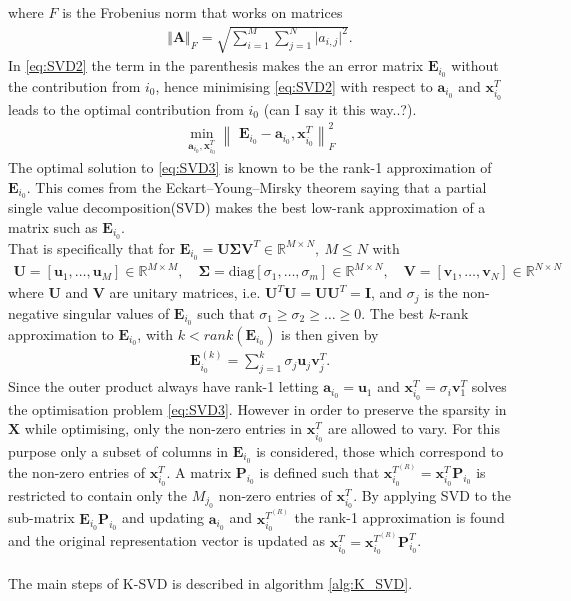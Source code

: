 where $F$ is the Frobenius norm that works on matrices
\begin{align*}
\Vert \mathbf{A} \Vert_F = \sqrt{\sum_{i=1}^M \sum_{j=1}^N \vert a_{i,j} \vert^2}.
\end{align*} 
In \eqref{eq:SVD2} the term in the parenthesis makes the an error matrix $\textbf{E}_{i_0}$ without the contribution from $i_{0}$, hence minimising \eqref{eq:SVD2} with respect to $\textbf{a}_{i_{0}}$ and $\textbf{x}_{i_{0}}^{T}$ leads to the optimal contribution from $i_{0}$ (can I say it this way..?). 
\begin{align}
\min_{\textbf{a}_{i_{0}},\textbf{x}_{i_0}^{T}}\left\|\textbf{ E}_{i_{0}}-\textbf{a}_{i_{0}},\textbf{x}_{i_0}^{T} \right\|_{F}^{2}\label{eq:SVD3}
\end{align} 
The optimal solution to \eqref{eq:SVD3} is known to be the rank-1 approximation of $\textbf{E}_{i_{0}}$. This comes from the Eckart–Young–Mirsky theorem\cite{?} saying that a partial single value decomposition(SVD) makes the best low-rank approximation of a matrix such as $\textbf{E}_{i_0}$.\\
That is specifically that for $\textbf{E}_{i_0}=\textbf{U}\boldsymbol{\Sigma}\textbf{V}^T\in \mathbb{R}^{M\times N},\ M \leq N$ with 
\begin{align*}
\textbf{U}=\left[\textbf{u}_1, \hdots, \textbf{u}_M\right] \in \mathbb{R}^{M\times M}, \quad \boldsymbol{\Sigma}=\text{diag}\left[\sigma_1, \hdots , \sigma_m \right] \in \mathbb{R}^{M\times N}, \quad \textbf{V}=\left[\textbf{v}_1, \hdots, \textbf{v}_N\right] \in \mathbb{R}^{N\times N} 
\end{align*}  
where $\textbf{U}$ and $\textbf{V}$ are unitary matrices, i.e. $\textbf{U}^T\textbf{U}=\textbf{UU}^T=\textbf{I}$, and $\sigma_j$ is the non-negative singular values of $\textbf{E}_{i_0}$ such that $\sigma_1\geq \sigma_2 \geq \hdots \geq 0$. The best $k$-rank approximation to $\textbf{E}_{i_0}$, with $k< rank(\textbf{E}_{i_0})$ is then given by\cite{Wiki..} 
\begin{align*}
\textbf{E}_{i_{0}}^{(k)}= \sum_{j=1}^{k}\sigma_j\textbf{u}_{j}\textbf{v}_{j}^T.
\end{align*} 
Since the outer product always have rank-1 letting $\textbf{a}_{i_0}=\textbf{u}_1$ and $\textbf{x}_{i_0}^T = \sigma_{i}\textbf{v}_{1}^T$ solves the optimisation problem \eqref{eq:SVD3}.
However in order to preserve the sparsity in $\textbf{X}$ while optimising, only the non-zero entries in $\textbf{x}_{i_0}^T$ are allowed to vary. For this purpose only a subset of columns in $\textbf{E}_{i_0}$ is considered, those which correspond to the non-zero entries of $\textbf{x}_{i_0}^T$. A matrix $\textbf{P}_{i_0}$ is defined such that $\textbf{x}_{i_0}^{T^{(R)}}=\textbf{x}_{i_0}^T\textbf{P}_{i_0} $ is restricted to contain only the $M_{j_0}$ non-zero entries of $\textbf{x}_{i_0}^T$. By applying SVD to the  sub-matrix $\textbf{E}_{i_0}\textbf{P}_{i_0}$ and updating $\textbf{a}_{i_0}$ and $\textbf{x}_{i_0}^{T^{(R)}}$ the rank-1 approximation is found and the original representation vector is updated as $\textbf{x}_{i_0}^{T}=\textbf{x}_{i_0}^{T^{(R)}}\textbf{P}_{i_0}^{T}$.  \\ \\
The main steps of K-SVD is described in algorithm \ref{alg:K_SVD}. 

